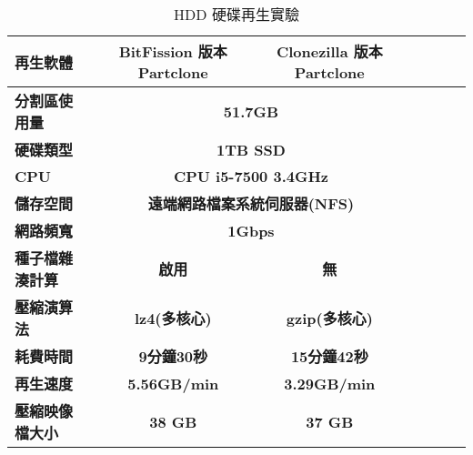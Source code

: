 \begin{table}[htbp]
\centering
\caption{HDD 硬碟再生實驗}
\label{imaging_hdd}
\begin{adjustbox}{max width=0.92\textwidth}
\begin{tabular}{lcccccc}

\toprule
\multicolumn{1}{l}{\textbf{再生軟體}} & \textbf{BitFission 版本 Partclone} & \textbf{Clonezilla 版本 Partclone} \\ \midrule
\multicolumn{1}{l}{\textbf{分割區使用量}} & \multicolumn{2}{c}{\textbf{51.7GB}} \\

\multicolumn{1}{l}{\textbf{硬碟類型}} & \multicolumn{2}{c}{\textbf{1TB SSD}} \\

\multicolumn{1}{l}{\textbf{CPU}} & \multicolumn{2}{c}{\textbf{CPU i5-7500 3.4GHz}} \\

\multicolumn{1}{l}{\textbf{儲存空間}} & \multicolumn{2}{c}{\textbf{遠端網路檔案系統伺服器(NFS)}} \\

\multicolumn{1}{l}{\textbf{網路頻寬}} & \multicolumn{2}{c}{\textbf{1Gbps}} \\

\multicolumn{1}{l}{\textbf{種子檔雜湊計算}} & \textbf{啟用} & \textbf{無} \\

\multicolumn{1}{l}{\textbf{壓縮演算法}} & \textbf{lz4(多核心)} & \textbf{gzip(多核心)} \\

\multicolumn{1}{l}{\textbf{耗費時間}} & \textbf{9分鐘30秒} & \textbf{15分鐘42秒} \\

\multicolumn{1}{l}{\textbf{再生速度}} & \textbf{5.56GB/min} & \textbf{3.29GB/min} \\

\multicolumn{1}{l}{\textbf{壓縮映像檔大小}} & \textbf{38 GB} & \textbf{37 GB} \\

\bottomrule
\end{tabular}
\end{adjustbox}
\end{table}
